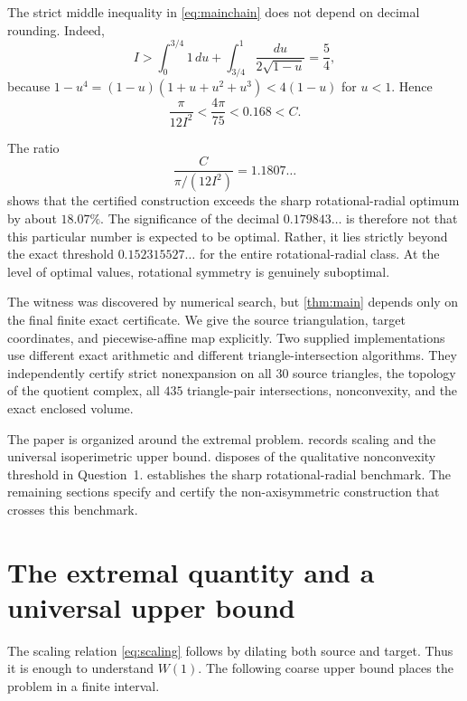 The strict middle inequality in \eqref{eq:mainchain} does not depend on decimal rounding.  Indeed,
\[
I>\int_0^{3/4}1\,du
+\int_{3/4}^1\frac{du}{2\sqrt{1-u}}
=\frac54,
\]
because $1-u^4=(1-u)(1+u+u^2+u^3)<4(1-u)$ for $u<1$.  Hence
\[
\frac{\pi}{12I^2}<\frac{4\pi}{75}<0.168<C.
\]

The ratio
\[
\frac{C}{\pi/(12I^2)}=1.1807\ldots
\]
shows that the certified construction exceeds the sharp rotational-radial optimum by about $18.07\%$.  The significance of the decimal $0.179843\ldots$ is therefore not that this particular number is expected to be optimal.  Rather, it lies strictly beyond the exact threshold $0.152315527\ldots$ for the entire rotational-radial class.  At the level of optimal values, rotational symmetry is genuinely suboptimal.

The witness was discovered by numerical search, but \cref{thm:main} depends only on the final finite exact certificate.  We give the source triangulation, target coordinates, and piecewise-affine map explicitly.  Two supplied implementations use different exact arithmetic and different triangle-intersection algorithms.  They independently certify strict nonexpansion on all $30$ source triangles, the topology of the quotient complex, all $435$ triangle-pair intersections, nonconvexity, and the exact enclosed volume.

The paper is organized around the extremal problem.   records scaling and the universal isoperimetric upper bound.   disposes of the qualitative nonconvexity threshold in Question~1.   establishes the sharp rotational-radial benchmark.  The remaining sections specify and certify the non-axisymmetric construction that crosses this benchmark.

\section{The extremal quantity and a universal upper bound}\label{sec:bounds}
The scaling relation \eqref{eq:scaling} follows by dilating both source and target.  Thus it is enough to understand $W(1)$.  The following coarse upper bound places the problem in a finite interval.


